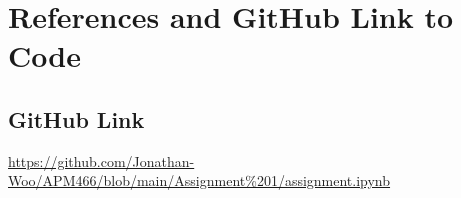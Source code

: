 \documentclass{article}
\begin{document}
\newpage
\section*{References and GitHub Link to Code}
\subsection*{GitHub Link}
\href{https://github.com/Jonathan-Woo/APM466/blob/main/Assignment%201/assignment.ipynb}{https://github.com/Jonathan-Woo/APM466/blob/main/Assignment\%201/assignment.ipynb}

\printbibliography
\end{document}
